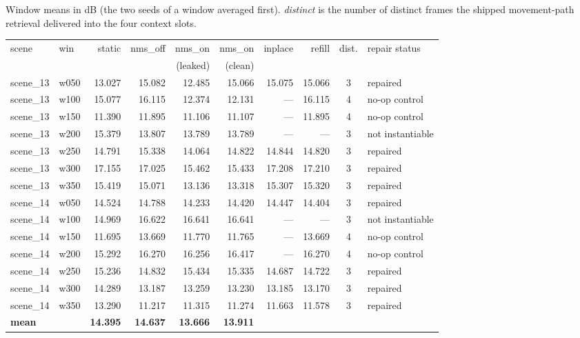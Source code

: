 \documentclass[11pt,a4paper]{article}
\begin{document}
Window means in dB (the two seeds of a window averaged first). \emph{distinct} is the number of
distinct frames the shipped movement-path retrieval delivered into the four context slots.

\begin{center}\footnotesize
\begin{tabular}{@{}llrrrrrrcl@{}}
\toprule
scene & win & static & nms\_off & nms\_on & nms\_on & inplace & refill & dist. & repair status \\
      &     &        &          & (leaked) & (clean) &         &        &       & \\
\midrule
scene\_13 & w050 & 13.027 & 15.082 & 12.485 & 15.066 & 15.075 & 15.066 & 3 & repaired \\
scene\_13 & w100 & 15.077 & 16.115 & 12.374 & 12.131 & --- & 16.115 & 4 & no-op control \\
scene\_13 & w150 & 11.390 & 11.895 & 11.106 & 11.107 & --- & 11.895 & 4 & no-op control \\
scene\_13 & w200 & 15.379 & 13.807 & 13.789 & 13.789 & --- & --- & 3 & not instantiable \\
scene\_13 & w250 & 14.791 & 15.338 & 14.064 & 14.822 & 14.844 & 14.820 & 3 & repaired \\
scene\_13 & w300 & 17.155 & 17.025 & 15.462 & 15.433 & 17.208 & 17.210 & 3 & repaired \\
scene\_13 & w350 & 15.419 & 15.071 & 13.136 & 13.318 & 15.307 & 15.320 & 3 & repaired \\
scene\_14 & w050 & 14.524 & 14.788 & 14.233 & 14.420 & 14.447 & 14.404 & 3 & repaired \\
scene\_14 & w100 & 14.969 & 16.622 & 16.641 & 16.641 & --- & --- & 3 & not instantiable \\
scene\_14 & w150 & 11.695 & 13.669 & 11.770 & 11.765 & --- & 13.669 & 4 & no-op control \\
scene\_14 & w200 & 15.292 & 16.270 & 16.256 & 16.417 & --- & 16.270 & 4 & no-op control \\
scene\_14 & w250 & 15.236 & 14.832 & 15.434 & 15.335 & 14.687 & 14.722 & 3 & repaired \\
scene\_14 & w300 & 14.289 & 13.187 & 13.259 & 13.230 & 13.185 & 13.170 & 3 & repaired \\
scene\_14 & w350 & 13.290 & 11.217 & 11.315 & 11.274 & 11.663 & 11.578 & 3 & repaired \\
\midrule
\textbf{mean} & & \textbf{14.395} & \textbf{14.637} & \textbf{13.666} & \textbf{13.911} & & & & \\
\bottomrule
\end{tabular}
\end{center}
\end{document}
